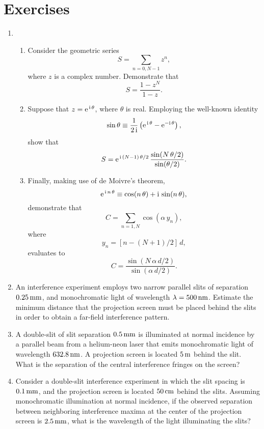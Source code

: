 \section{Exercises}
{\small 
\begin{enumerate}
\item 
\begin{enumerate}
\item Consider the geometric series 
$$
S= \sum_{n=0,N-1} z^n,
$$
where $z$ is a complex number. Demonstrate that
$$
S = \frac{1-z^N}{1-z}.
$$

\item Suppose that $z={\rm e}^{\,{\rm i}\,\theta}$, where $\theta$ is real. Employing the well-known
identity
$$
\sin\theta \equiv \frac{1}{2\,{\rm i}}\left({\rm e}^{\,{\rm i}\,\theta} - {\rm e}^{-{\rm i}\,\theta}\right),
$$
show that
$$
S = {\rm e}^{\,{\rm i}\,(N-1)\,\theta/2}\,\frac{\sin(N\,\theta/2)}{\sin(\theta/2)}.
$$

\item Finally, making use of de Moivre's theorem,
$$
{\rm e}^{\,{\rm i}\,n\,\theta} \equiv \cos(n\,\theta) + {\rm i}\,\sin(n\,\theta),
$$
demonstrate that 
$$
C=\sum_{n=1,N} \cos(\alpha\,y_n),
$$
where
$$
y_n = [n-(N+1)/2]\,d,
$$
evaluates to
$$
C = \frac{\sin(N\,\alpha\,d/2)}{\sin(\alpha\,d/2)}.
$$
\end{enumerate}

\item An interference experiment employs two narrow parallel slits of separation $0.25\,{\rm mm}$, and monochromatic  light of wavelength $\lambda=500\,{\rm nm}$.
Estimate the minimum distance that the projection screen must be placed behind the slits in order to obtain a far-field interference
pattern. 

\item A double-slit of slit separation $0.5\,{\rm mm}$ is illuminated at normal incidence by a parallel beam from
a helium-neon laser that emits monochromatic light of wavelength $632.8\,{\rm nm}$. A projection
screen is located $5\,{\rm m}$ behind the slit. What is the separation of the central interference fringes on the screen?

\item Consider a double-slit interference experiment in which the slit spacing is $0.1\,{\rm mm}$, and the
projection screen is located $50\,{\rm cm}$ behind the slits. Assuming monochromatic illumination at normal incidence, if the observed separation between neighboring interference 
maxima at the center of the projection screen is $2.5\,{\rm mm}$, what is the wavelength of the
light illuminating the slits?


\end{enumerate}}
